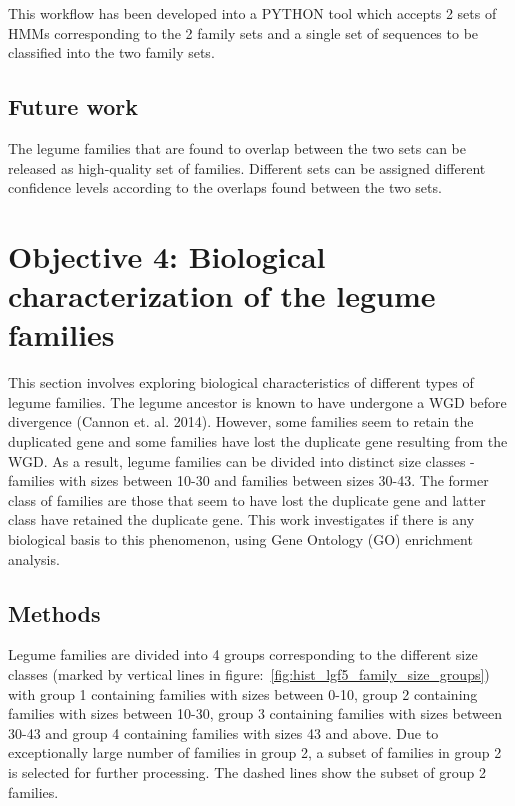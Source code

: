 \documentclass{article}
\begin{document}
		This workflow has been developed into a PYTHON tool which accepts 2 sets of HMMs corresponding to the 2 family sets and a single set of sequences to be classified into the two family sets.
		
		\subsection{Future work}
		The legume families that are found to overlap between the two sets can be released as high-quality set of families. Different sets can be assigned different confidence levels according to the overlaps found between the two sets.
	
	\pagebreak
	\section{Objective 4: Biological characterization of the legume families}
	This section involves exploring biological characteristics of different types of legume families. The legume ancestor is known to have undergone a WGD before divergence (Cannon et. al. 2014).  However, some families seem to retain the duplicated gene and some families have lost the duplicate gene resulting from the WGD. As a result, legume families can be divided into distinct size classes - families with sizes between 10-30 and families between sizes 30-43. The former class of families are those that seem to have lost the duplicate gene and latter class have retained the duplicate gene. This work investigates if there is any biological basis to this phenomenon, using Gene Ontology (GO) enrichment analysis. 
	
		\subsection{Methods}
		Legume families are divided into 4 groups corresponding to the different size classes (marked by vertical lines in figure:~\ref{fig:hist_lgf5_family_size_groups}) with group 1 containing families with sizes between 0-10, group 2 containing families with sizes between 10-30, group 3 containing families with sizes between 30-43 and group 4 containing families with sizes 43 and above. Due to exceptionally large number of families in group 2, a subset of families in group 2 is selected for further processing. The dashed lines show the subset of group 2 families.
		
\end{document}
